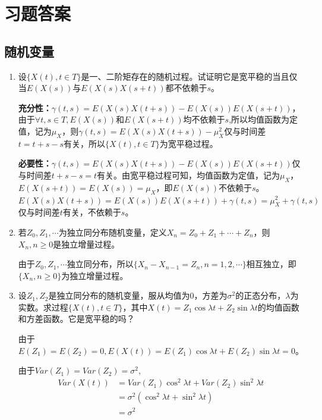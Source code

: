 
\chapter{习题答案}

\section{随机变量}

\begin{enumerate}
	\item 设\(\{X(t),t\in T\}\)是一、二阶矩存在的随机过程。试证明它是宽平稳的当且仅当\(E(X(s))\)与\(E(X(s)X(s+t))\)都不依赖于\(s\)。

	      \textbf{充分性：}\(\gamma(t,s)=E(X(s)X(t+s))-E(X(s))E(X(s+t))\)，由于\(\forall t,s\in T,E(X(s))\)和\(E(X(s+t))\)均不依赖于\(s\),所以均值函数为定值，记为\(\mu_X\)，则\(\gamma(t,s)=E(X(s)X(t+s))-\mu_X^2\)仅与时间差\(t=t+s-s\)有关，所以\(\{X(t),t\in T\}\)为宽平稳过程。

	      \textbf{必要性：}\(\gamma(t,s)=E(X(s)X(t+s))-E(X(s))E(X(s+t))\)仅与时间差\(t+s-s=t\)有关。由宽平稳过程可知，均值函数为定值，记为\(\mu_X\)，\(E(X(s+t))=E(X(s))=\mu_X\)，即\(E(X(s))\)不依赖于\(s\)。\(E(X(s)X(t+s))=E(X(s))E(X(s+t))+\gamma(t,s)=\mu_X^2+\gamma(t,s)\)仅与时间差\(t\)有关，不依赖于\(s\)。

	\item 若\(Z_0,Z_1,\cdots\)为独立同分布随机变量，定义\(X_n=Z_0+Z_1+\cdots+Z_n\)，则\({X_n,n\geqslant0}\)是独立增量过程。

	      由于\(Z_0,Z_1,\cdots\)独立同分布，所以\(\{X_n-X_{n-1}=Z_n,n=1,2,\cdots \}\)相互独立，即\(\{X_n,n\geqslant0\}\)为独立增量过程。

	\item 设\(Z_1,Z_2\)是独立同分布的随机变量，服从均值为0，方差为\(\sigma^2\)的正态分布，\(\lambda\)为实数。求过程\(\{X(t),t\in T\}\)，其中\(X(t)=Z_1\cos \lambda t+Z_2 \sin \lambda t\)的均值函数和方差函数。它是宽平稳的吗？

	      由于\(E(Z_1)=E(Z_2)=0,E(X(t))=E(Z_1)\cos\lambda t+E(Z_2)\sin \lambda t=0\)。

	      由于\(Var(Z_1)=Var(Z_2)=\sigma^2\),
	      \begin{align*}
		      Var(X(t)) & =Var(Z_1)\cos^2\lambda t+Var(Z_2)\sin^2 \lambda t \\
		                & =\sigma^2(\cos^2\lambda t+\sin^2 \lambda t)       \\
		                & =\sigma^2
	      \end{align*}


\end{enumerate}
